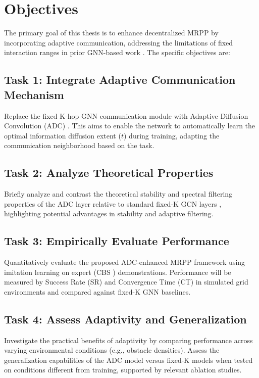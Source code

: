 \newpage
\section{Objectives}
\label{sec:objectives}

The primary goal of this thesis is to enhance decentralized MRPP by incorporating adaptive communication, addressing the limitations of fixed interaction ranges in prior GNN-based work \cite{Li2021GNNCoordination}. The specific objectives are:

\subsection{Task 1: Integrate Adaptive Communication Mechanism}
\label{subsec:obj_integrate}
Replace the fixed K-hop GNN communication module \cite{Li2021GNNCoordination} with Adaptive Diffusion Convolution (ADC) \cite{Zhao2021ADC}. This aims to enable the network to automatically learn the optimal information diffusion extent ($t$) during training, adapting the communication neighborhood based on the task.

\subsection{Task 2: Analyze Theoretical Properties}
\label{subsec:obj_analysis}
Briefly analyze and contrast the theoretical stability and spectral filtering properties of the ADC layer relative to standard fixed-K GCN layers \cite{Kipf2017GCN}, highlighting potential advantages in stability \cite{Zhao2021ADC, Gama2019StabilityGNN} and adaptive filtering.

\subsection{Task 3: Empirically Evaluate Performance}
\label{subsec:obj_evaluation}
Quantitatively evaluate the proposed ADC-enhanced MRPP framework using imitation learning on expert (CBS \cite{Sharon2015CBS}) demonstrations. Performance will be measured by Success Rate (SR) and Convergence Time (CT) in simulated grid environments and compared against fixed-K GNN baselines.

\subsection{Task 4: Assess Adaptivity and Generalization}
\label{subsec:obj_adaptivity}
Investigate the practical benefits of adaptivity by comparing performance across varying environmental conditions (e.g., obstacle densities). Assess the generalization capabilities of the ADC model versus fixed-K models when tested on conditions different from training, supported by relevant ablation studies.

